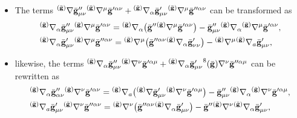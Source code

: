 \documentclass[11pt]{article}
\numberwithin{equation}{section}
\def\grad{{\nabla}}%
\newcommand{\leftexp}[2]{{\vphantom{#2}}^{#1}{#2}}
\def \a{\alpha}
\renewcommand{\gg}{{\bf g}}
\newcommand{\bgg}{{\bar{\bf g}}}
\renewcommand{\a}{\alpha}
\numberwithin{equation}{section}
\begin{document}
\begin{itemize}\itemsep=0pt
\item The terms $\leftexp{(\bar{\gg})}{\grad} \bgg''_{\mu \nu} \leftexp{(\bar{\gg})}{\grad}^\mu \bgg'^{\a \nu} +
\leftexp{(\bar{\gg})}{\grad}_\a \bgg'_{\mu \nu} \leftexp{(\bar{\gg})}{\grad}^\mu \bgg''^{\a \nu} $
can be transformed as
\begin{align*}
&\leftexp{(\bar{\gg})}{\grad}_\a \bgg''_{\mu \nu} \leftexp{(\bar{\gg})}{\grad}^\mu \bgg'^{\a \nu} =
\leftexp{(\bar{\gg})}{\grad}_\a \bigl(\bgg'' \leftexp{(\bar{\gg})}{\grad}^\mu \bgg'^{\a \nu}\bigr) - \bgg''_{\mu \nu} \leftexp{(\bar{\gg})}{\grad}_\a \leftexp{(\bar{\gg})}{\grad}^\mu \bgg'^{\a \nu}, \\
&\leftexp{(\bar{\gg})}{\grad}_\a \bgg'_{\mu \nu} \leftexp{(\bar{\gg})}{\grad}^\mu \bgg''^{\a \nu}=
\leftexp{(\bar{\gg})}{\grad}^\mu \bigl(\bgg''^{\a \nu} \leftexp{(\bar{\gg})}{\grad}_\a \bgg'_{\nu \nu}\bigr)-
\leftexp{(\bar{\gg})}{\grad}^\mu \leftexp{(\bar{\gg})}{\grad}_a \bgg'_{\mu \nu},
\end{align*}

\item likewise, the terms $ \leftexp{(\bar{\gg})}{\grad}_\a \bgg''_{\mu \nu} \leftexp{(\bar{\gg})}{\grad}^\nu \bgg'^{\a \mu} + \leftexp{(\bar{\gg})}{\grad}_\a \bgg'_{ \mu \nu} \leftexp8{(\bar{\gg})}{\grad}^\nu \bgg''^{\a \mu}$ can be rewritten as
\begin{align*}
&\leftexp{(\bar{\gg})}{\grad}_\a \bgg''_{\a \nu} \leftexp{(\bar{\gg})}{\grad}^\nu \bgg'^{ \a \nu}=
\leftexp{(\bar{\gg})}{\grad}_a \bigl(\leftexp{(\bar{\gg})}{\grad} \bgg'_{\mu \nu} \leftexp{(\bar{\gg})}{\grad} ^\nu \bgg'^{ \a \mu }\bigr) - \bgg''_{\mu \nu} \leftexp{(\bar{\gg})}{\grad}_\a \leftexp{(\bar{\gg})}{\grad}^\nu \bgg'^{\a \mu} ,\\
&\leftexp{(\bar{\gg})}{\grad}_a \bgg'_{\mu \nu} \leftexp{(\bar{\gg})}{\grad}^\nu \bgg''^{\a \nu}=
\leftexp{(\bar{\gg})}{\grad}^\nu \bigl(\bgg''^{\a \nu} \leftexp{(\bar{\gg})}{\grad}_\a \bgg'_{\mu \nu}\bigr) -
\bgg'' \leftexp{(\bar{\gg})}{\grad}^\nu \leftexp{(\bar{\gg})}{\grad}_\a \bgg'_{\mu \nu},
\end{align*}


\end{itemize}
\end{document}
